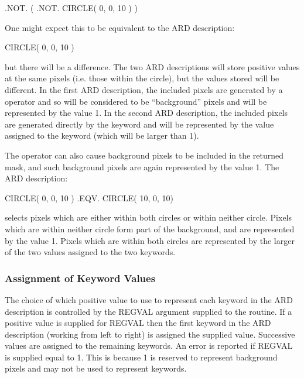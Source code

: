 \documentclass[11pt]{starlink}
\begin{document}
\small
\begin{terminalv}
      .NOT. ( .NOT. CIRCLE( 0, 0, 10 ) )
\end{terminalv}
\normalsize

One might expect this to be equivalent to the ARD description:

\small
\begin{terminalv}
      CIRCLE( 0, 0, 10 )
\end{terminalv}
\normalsize

but there will be a difference. The two ARD descriptions will store positive
values at the same pixels (i.e. those within the circle), but the values stored
will be different. In the first ARD description, the included pixels are
generated by a  operator and so will be considered to be ``background''
pixels and will be represented by the value 1. In the second ARD description,
the included pixels are generated directly by the  keyword and will be
represented by the value assigned to the keyword (which will be larger than 1).

The  operator can also cause background pixels to be included in the
returned mask, and such background pixels are again represented by the value 1.
The ARD description:

\small
\begin{terminalv}
      CIRCLE( 0, 0, 10 ) .EQV. CIRCLE( 10, 0, 10)
\end{terminalv}
\normalsize

selects pixels which are either within both circles or within neither circle.
Pixels which are within neither circle form part of the background, and are
represented by the value 1. Pixels which are within both circles are represented
by the larger of the two values assigned to the two keywords.

\subsubsection{Assignment of Keyword Values}
The choice of which positive value to use to represent each keyword in the ARD
description is controlled by the REGVAL argument supplied to the 
routine. If a positive value is supplied for REGVAL then the first keyword in the
ARD description (working from left to right) is assigned the supplied value.
Successive values are assigned to the remaining keywords. An error is reported
if REGVAL is supplied equal to 1. This is because 1 is reserved to represent
background pixels and may not be used to represent keywords.
\end{document}
